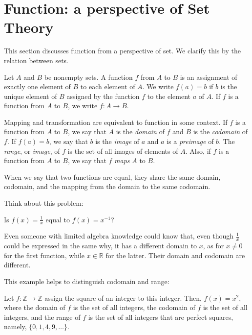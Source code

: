 \documentclass[
	12pt, %
	fleqn, %
	a4paper, %
]{LegrandOrangeBook}
\begin{document}
\section{Function: a perspective of Set Theory}
This section discusses function from a perspective of set. We clarify this by the relation between sets.
\begin{definition}[Function]

Let \( A \) and \( B \) be nonempty sets. A function \( f \) from \( A \) to \( B \) is an assignment of exactly one element of \( B \) to each element of \( A \). We write \( f(a) = b \) if \( b \) is the unique element of \( B \) assigned by the function \( f \) to the element \( a \) of \( A \). If \( f \) is a function from \( A \) to \( B \), we write \( f : A \rightarrow B \).
    
\end{definition}
\begin{remark}
    Mapping and transformation are equivalent to function in some context. If \( f \) is a function from \( A \) to \( B \), we say that \( A \) is the \emph{domain} of \( f \) and \( B \) is the \emph{codomain} of \( f \). If \( f(a) = b \), we say that \( b \) is the \emph{image} of \( a \) and \( a \) is a \emph{preimage} of \( b \). The \emph{range}, or \emph{image}, of \( f \) is the set of all images of elements of \( A \). Also, if \( f \) is a function from \( A \) to \( B \), we say that \( f \) \emph{maps} \( A \) to \( B \).
\end{remark}

When we say that two functions are equal, they share the same domain, codomain, and the mapping from the domain to the same codomain.

Think about this problem:
\begin{problem}
    Is $f(x) = \frac{1}{x}$ equal to $f(x) = x^{-1} $?
\end{problem}
Even someone with limited algebra knowledge could know that, even though $\frac{1} {x}$ could be expressed in the same why, it has a different domain to $x$, as for $x \neq 0$ for the first function, while $x\in \mathbb{R}$ for the latter. Their domain and codomain are different.

This example helps to distinguish codomain and range:
\begin{example}
    Let \( f: \mathbb{Z} \rightarrow \mathbb{Z} \) assign the square of an integer to this integer. Then, \( f(x) = x^2 \), where the domain of \( f \) is the set of all integers, the codomain of \( f \) is the set of all integers, and the range of \( f \) is the set of all integers that are perfect squares, namely, \( \{0, 1, 4, 9, \ldots \} \).
\end{example}
\end{document}
